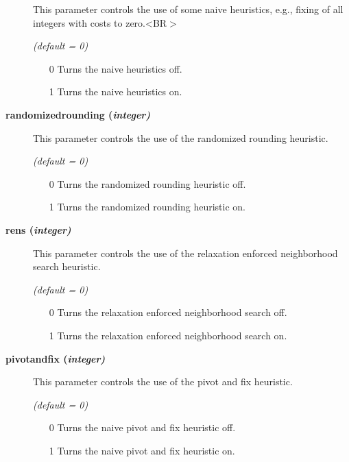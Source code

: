 \begin{description}
This parameter controls the use of some naive heuristics, e.g., fixing of all integers with costs to zero.<BR$>$

\textsl{(default = 0)}
\begin{itemize}
\item[0] 
Turns the naive heuristics off.
\item[1] 
Turns the naive heuristics on.
\end{itemize}

\item[\label{randomizedrounding}\hypertarget{randomizedrounding}
{\textbf{randomizedrounding (\slshape{integer})}}]\hspace{1.0in}

This parameter controls the use of the randomized rounding heuristic.

\textsl{(default = 0)}
\begin{itemize}
\item[0] 
Turns the randomized rounding heuristic off.
\item[1] 
Turns the randomized rounding heuristic on.
\end{itemize}

\item[\label{rens}\hypertarget{rens}
{\textbf{rens (\slshape{integer})}}]\hspace{1.0in}

This parameter controls the use of the relaxation enforced neighborhood search heuristic.

\textsl{(default = 0)}
\begin{itemize}
\item[0] 
Turns the relaxation enforced neighborhood search off.
\item[1] 
Turns the relaxation enforced neighborhood search on.
\end{itemize}

\item[\label{pivotandfix}\hypertarget{pivotandfix}
{\textbf{pivotandfix (\slshape{integer})}}]\hspace{1.0in}

This parameter controls the use of the pivot and fix heuristic.

\textsl{(default = 0)}
\begin{itemize}
\item[0] 
Turns the naive pivot and fix heuristic off.
\item[1] 
Turns the naive pivot and fix heuristic on.
\end{itemize}


\end{description}
